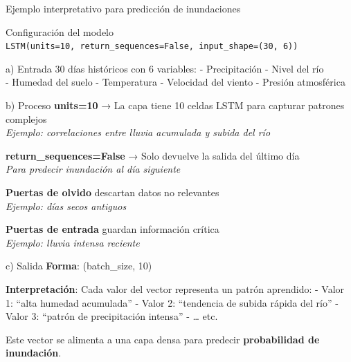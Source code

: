 \documentclass[
  ignorenonframetext,
]{beamer}
\begin{document}
\begin{frame}[fragile]{Ejemplo interpretativo para predicción de
inundaciones}
\label{ejemplo-interpretativo-para-predicciuxf3n-de-inundaciones}
\begin{block}{Configuración del modelo}
\label{configuraciuxf3n-del-modelo}
\texttt{LSTM(units=10,\ return\_sequences=False,\ input\_shape=(30,\ 6))}

\begin{block}{a) Entrada}
\label{a-entrada}
30 días históricos con 6 variables: - Precipitación - Nivel del río\\
- Humedad del suelo - Temperatura - Velocidad del viento - Presión
atmosférica
\end{block}

\begin{block}{b) Proceso}
\label{b-proceso}
\textbf{units=10} → La capa tiene 10 celdas LSTM para capturar patrones
complejos\\
\emph{Ejemplo: correlaciones entre lluvia acumulada y subida del río}

\textbf{return\_sequences=False} → Solo devuelve la salida del último
día\\
\emph{Para predecir inundación al día siguiente}

\textbf{Puertas de olvido} descartan datos no relevantes\\
\emph{Ejemplo: días secos antiguos}

\textbf{Puertas de entrada} guardan información crítica\\
\emph{Ejemplo: lluvia intensa reciente}
\end{block}

\begin{block}{c) Salida}
\label{c-salida}
\textbf{Forma}: (batch\_size, 10)

\textbf{Interpretación}: Cada valor del vector representa un patrón
aprendido: - Valor 1: ``alta humedad acumulada'' - Valor 2: ``tendencia
de subida rápida del río'' - Valor 3: ``patrón de precipitación
intensa'' - \ldots{} etc.

Este vector se alimenta a una capa densa para predecir
\textbf{probabilidad de inundación}.
\end{block}
\end{block}
\end{frame}
\end{document}
